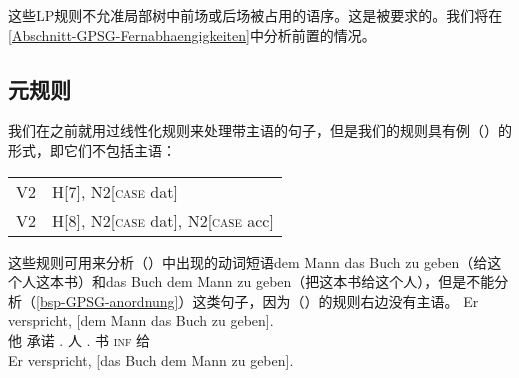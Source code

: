 这些LP规则不允准局部树中前场或后场被占用的语序。这是被要求的。我们将在\ref{Abschnitt-GPSG-Fernabhaengigkeiten}中分析前置的情况。

\subsection{元规则}
\label{sec-metarules-gpsg}

我们在之前就用过线性化规则来处理带主语的句子，但是我们的规则具有例（）的形式，即它们不包括主语：
\ea
\label{gpsg-regel-dat-ditransitiv}
\begin{tabular}[t]{@{}l@{~$\to$~}l@{}}
V2  & H[7], N2[\textsc{case} dat]                \\
V2  & H[8], N2[\textsc{case} dat], N2[\textsc{case} acc]  \\
\end{tabular}
\z
这些规则可用来分析（）中出现的动词短语dem Mann das Buch zu geben（给这个人这本书）和das Buch dem Mann zu geben（把这本书给这个人），但是不能分析（\ref{bsp-GPSG-anordnung}）这类句子，因为（）的规则右边没有主语。
\eal
\ex 
\gll Er verspricht, [dem Mann das Buch zu geben].\\
     他 承诺    \spacebr{}.\dat{} 人 .\acc{} 书 \textsc{inf} 给\\
\ex 
\gll Er verspricht, [das Buch dem Mann zu geben].\\
